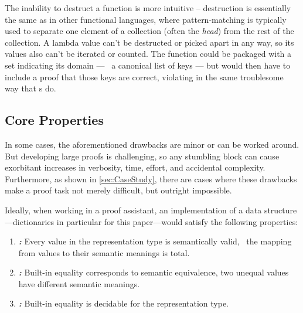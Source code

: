 The inability to destruct a function is more intuitive -- destruction is essentially the same as in other functional languages, where pattern-matching is typically used to separate one element of a collection (often the \emph{head}) from the rest of the collection.
%
A lambda value can't be destructed or picked apart in any way, so its values also can't be iterated or counted.
%
The function could be packaged with a set indicating its domain --- \ie{}~a canonical list of keys --- but would then have to include a proof that those keys are correct, violating \SemTot{} in the same troublesome way that \cal{}s do.

\subsection{Core Properties}

In some cases, the aforementioned drawbacks are minor or can be worked around.
%
But developing large proofs is challenging, so any stumbling block can cause exorbitant increases in verbosity, time, effort, and accidental complexity.
%
Furthermore, as shown in \autoref{sec:CaseStudy}, there are cases where these drawbacks make a proof task not merely difficult, but outright impossible.


Ideally, when working in a proof assistant, an implementation of a data structure---dictionaries in particular for this paper---would satisfy the following properties:

\newcommand{\designGoal}[1]
  {\textbf{\emph{#1:}}}

\begin{enumerate}

\item
%
\designGoal{\SemTot}
%
Every value in the representation type is semantically valid, \ie{}~the mapping from values to their semantic meanings is total.

\item
%
\designGoal{\SemInj}
%
Built-in equality corresponds to semantic equivalence, \ie{} two unequal values have different semantic meanings.

\item
%
\designGoal{\EqDec}
%
Built-in equality is decidable for the representation type.

\end{enumerate}

